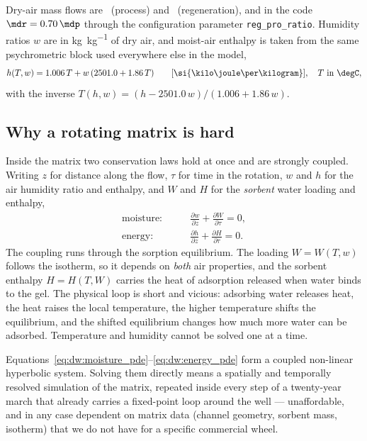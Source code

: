Dry-air mass flows are \mdp\ (process) and \mdr\ (regeneration), and in the
code $\mdr = 0.70\,\mdp$ through the configuration parameter
\texttt{reg\_pro\_ratio}. Humidity ratios $w$ are in
\si{\kilogram\per\kilogram} of dry air, and moist-air enthalpy is taken from
the same psychrometric block used everywhere else in the model,
\begin{equation}
h(T,w) = 1.006\,T + w\,(2501.0 + 1.86\,T)
\qquad [\si{\kilo\joule\per\kilogram}],\quad T\ \text{in \degC},
\label{eq:dw:enthalpy}
\end{equation}
with the inverse $T(h,w) = (h - 2501.0\,w)/(1.006 + 1.86\,w)$.

\subsection{Why a rotating matrix is hard}
\label{sec:dw:hard}

Inside the matrix two conservation laws hold at once and are strongly
coupled. Writing $z$ for distance along the flow, $\tau$ for time in the
rotation, $w$ and $h$ for the air humidity ratio and enthalpy, and $W$ and
$H$ for the \emph{sorbent} water loading and enthalpy,
\begin{align}
\text{moisture:}&\qquad
\frac{\partial w}{\partial z}+\frac{\partial W}{\partial \tau}=0,
\label{eq:dw:moisture_pde}\\
\text{energy:}&\qquad
\frac{\partial h}{\partial z}+\frac{\partial H}{\partial \tau}=0 .
\label{eq:dw:energy_pde}
\end{align}
The coupling runs through the sorption equilibrium. The loading $W=W(T,w)$
follows the isotherm, so it depends on \emph{both} air properties, and the
sorbent enthalpy $H=H(T,W)$ carries the heat of adsorption released when
water binds to the gel. The physical loop is short and vicious: adsorbing
water releases heat, the heat raises the local temperature, the higher
temperature shifts the equilibrium, and the shifted equilibrium changes how
much more water can be adsorbed. Temperature and humidity cannot be solved
one at a time.

Equations~\eqref{eq:dw:moisture_pde}--\eqref{eq:dw:energy_pde} form a coupled
non-linear hyperbolic system. Solving them directly means a spatially and
temporally resolved simulation of the matrix, repeated inside every step of a
twenty-year march that already carries a fixed-point loop around the well ---
unaffordable, and in any case dependent on matrix data (channel geometry,
sorbent mass, isotherm) that we do not have for a specific commercial wheel.


